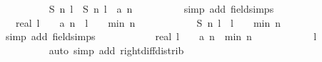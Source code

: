 \begin{isabellebody}
\ \ \ \ \ \ \ \ \isamarkupfalse%
\ {\isacharbackquoteopen}{\isacharquery}S\ n\ l\ {\isacharequal}\ {\isacharquery}S\ {\isacharparenleft}n{\isacharminus}{}{\isacharparenright}\ {\isacharparenleft}l{\isacharminus}{}{\isacharparenright}\ {\isacharplus}\ a\ {\isacharparenleft}n{\isacharminus}{}{\isacharparenright}{\isacharbackquoteclose}\isanewline
\ \ \ \ \ \ \ \ \isamarkupfalse%
\ {\isacharparenleft}simp\ add{\isacharcolon}\ field{\isacharunderscore}simps{\isacharparenright}\isanewline
\ \ \ \ \ \ \isamarkupfalse%
\ \isamarkupfalse%
\ {\isachardoublequoteopen}{\isachardot}{\isachardot}{\isachardot}\ {\isasymle}\ {\isacharparenleft}real\ l\ {\isacharminus}\ {}{\isacharparenright}\ {\isacharasterisk}\ a\ {\isacharparenleft}n{\isacharminus}{}{\isacharparenright}\ {\isacharminus}\ {\isacharparenleft}l\ {\isacharminus}\ {}{\isacharparenright}\ {\isacharasterisk}\ {\isacharquery}min\ {\isacharparenleft}n\ {\isacharminus}\ {}{\isacharparenright}{\isachardoublequoteclose}\isanewline
\ \ \ \ \ \ \ \ \isamarkupfalse%
\ {\isacharbackquoteopen}{\isacharquery}S\ {\isacharparenleft}n{\isacharminus}{}{\isacharparenright}\ {\isacharparenleft}l{\isacharminus}{}{\isacharparenright}\ {\isasymge}\ {\isacharparenleft}l\ {\isacharminus}\ {}{\isacharparenright}\ {\isacharasterisk}\ {\isacharquery}min\ {\isacharparenleft}n\ {\isacharminus}\ {}{\isacharparenright}{\isacharbackquoteclose}\isanewline
\ \ \ \ \ \ \ \ \isamarkupfalse%
\ {\isacharparenleft}simp\ add{\isacharcolon}\ field{\isacharunderscore}simps{\isacharparenright}\isanewline
\ \ \ \ \ \ \isamarkupfalse%
\ \isamarkupfalse%
\ {\isachardoublequoteopen}{\isachardot}{\isachardot}{\isachardot}\ {\isacharequal}\ {\isacharparenleft}real\ l\ {\isacharminus}\ {}{\isacharparenright}\ {\isacharasterisk}\ {\isacharparenleft}a\ {\isacharparenleft}n{\isacharminus}{}{\isacharparenright}\ {\isacharminus}\ {\isacharquery}min\ {\isacharparenleft}n\ {\isacharminus}\ {}{\isacharparenright}{\isacharparenright}{\isachardoublequoteclose}\isanewline
\ \ \ \ \ \ \ \ \isamarkupfalse%
\ {\isacharbackquoteopen}l\ {\isasymge}\ {}{\isacharbackquoteclose}\isanewline
\ \ \ \ \ \ \ \ \isamarkupfalse%
\ {\isacharparenleft}auto\ simp\ add{\isacharcolon}\ right{\isacharunderscore}diff{\isacharunderscore}distrib{\isacharparenright}\isanewline

\end{isabellebody}
